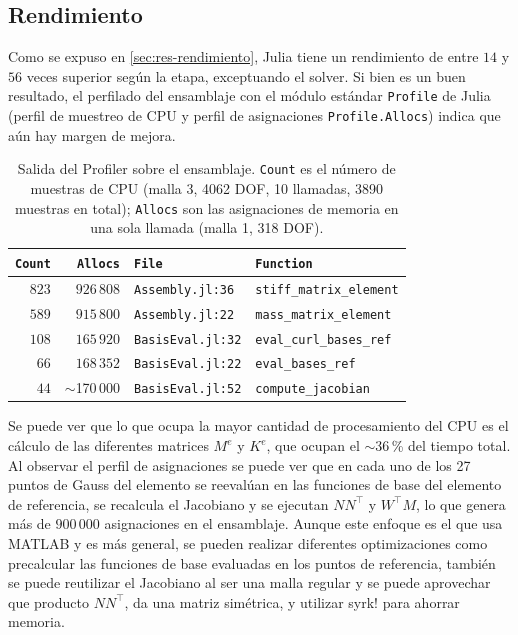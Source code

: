 \documentclass[12pt]{report} %
\begin{document}
\subsection{Rendimiento}
Como se expuso en \ref{sec:res-rendimiento}, Julia tiene un rendimiento de entre $14$ y $56$ veces superior según la etapa, exceptuando el solver. Si bien es un buen resultado, el perfilado del ensamblaje con el módulo estándar \texttt{Profile} de Julia (perfil de muestreo de CPU y perfil de asignaciones \texttt{Profile.Allocs}) indica que aún hay margen de mejora.

\begin{table}[htbp]
	\centering
	\caption{Salida del Profiler sobre el ensamblaje. \texttt{Count} es el número de muestras de CPU (malla 3, 4062 DOF, 10 llamadas, 3890 muestras en total); \texttt{Allocs} son las asignaciones de memoria en una sola llamada (malla 1, 318 DOF).}
	\label{tab:perfil}
	\begin{tabular}{rrll}
		\toprule
		\texttt{Count} & \texttt{Allocs} & \texttt{File} & \texttt{Function} \\
		\midrule
		$823$ & $926\,808$ & \texttt{Assembly.jl:36} & \texttt{stiff\_matrix\_element} \\
		$589$ & $915\,800$ & \texttt{Assembly.jl:22} & \texttt{mass\_matrix\_element} \\
		$108$ & $165\,920$ & \texttt{BasisEval.jl:32} & \texttt{eval\_curl\_bases\_ref} \\
		$66$ & $168\,352$ & \texttt{BasisEval.jl:22} & \texttt{eval\_bases\_ref} \\
		$44$ & $\sim$170\,000 & \texttt{BasisEval.jl:52} & \texttt{compute\_jacobian} \\
		\bottomrule
	\end{tabular} 
\end{table}
Se puede ver que lo que ocupa la mayor cantidad de procesamiento del CPU es el cálculo de las diferentes matrices $M^e$ y $K^e$, que ocupan el $\sim36$\,\% del tiempo total. Al observar el perfil de asignaciones se puede ver que en cada uno de los 27 puntos de Gauss del elemento se reevalúan en las funciones de base del elemento de referencia, se recalcula el Jacobiano y se ejecutan $N N^\top$ y $W^\top M$, lo que genera más de $900\,000$ asignaciones en el ensamblaje. Aunque este enfoque es el que usa MATLAB y es más general, se pueden realizar diferentes optimizaciones como precalcular las funciones de base evaluadas en los puntos de referencia, también se puede reutilizar el Jacobiano al ser una malla regular y se puede aprovechar que producto  $N N^\top$, da una matriz simétrica, y utilizar syrk! para ahorrar memoria.
\end{document}
